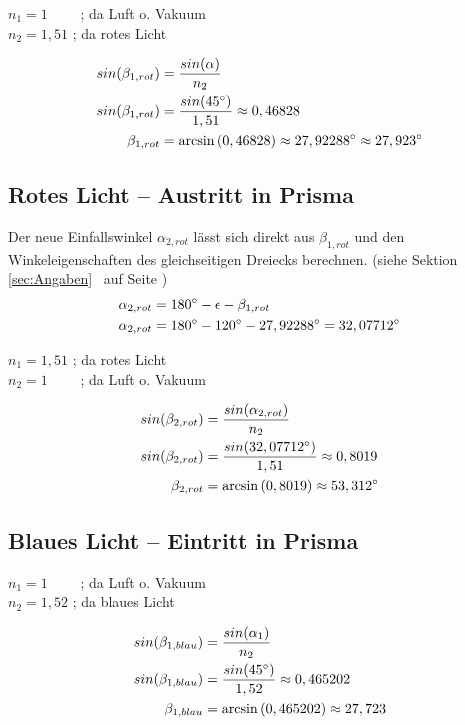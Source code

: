 $n_1 = 1$ \ \ \ \ ; da Luft o. Vakuum \\
$n_2 = 1,51$     ; da rotes Licht


\begin{align*}
	sin{(\beta_{1,rot})} &= \frac{sin{(\alpha})}{n_2} \\
	sin{(\beta_{1,rot})} &= \frac{sin{(45 \degree})}{1,51} \approx 0,46828 \\
	\beta_{1,rot} &= \arcsin{(0,46828)} \approx 27,92288 \degree \approx 27,923 \degree
\end{align*}



\subsection{Rotes Licht -- Austritt in Prisma}

Der neue Einfallswinkel $\alpha_{2,rot}$ lässt sich direkt aus $\beta_{1,rot}$ und den Winkeleigenschaften des gleichseitigen Dreiecks berechnen. (siehe Sektion \ref{sec:Angaben} \ auf Seite \pageref{sec:Angaben})
\begin{align*}
	\alpha_{2,rot} &= 180 \degree - \epsilon - \beta_{1,rot} \\
	\alpha_{2,rot} &= 180 \degree - 120 \degree - 27,92288 \degree = 32,07712 \degree
\end{align*}

\noindent
$n_1 = 1,51$     ; da rotes Licht \\
$n_2 = 1$ \ \ \ \ ; da Luft o. Vakuum

\begin{align*}
	sin{(\beta_{2,rot})} &= \frac{sin{(\alpha_{2,rot}})}{n_2} \\
	sin{(\beta_{2,rot})} &= \frac{sin{(32,07712 \degree})}{1,51} \approx 0,8019 \\
	\beta_{2,rot} &= \arcsin{(0,8019)} \approx 53,312 \degree
\end{align*}



\subsection{Blaues Licht -- Eintritt in Prisma}

$n_1 = 1$ \ \ \ \ ; da Luft o. Vakuum \\
$n_2 = 1,52$     ; da blaues Licht


\begin{align*}
	sin{(\beta_{1,blau})} &= \frac{sin{(\alpha_{1}})}{n_2} \\
	sin{(\beta_{1,blau})} &= \frac{sin{(45 \degree})}{1,52} \approx 0,465202 \\
	\beta_{1,blau} &= \arcsin{(0,465202)} \approx 27,723
\end{align*}



